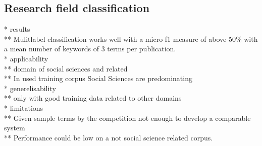 \subsection{Research field classification}
* results\\
**    Mulitlabel classification works well with a  micro f1 measure of above 50\% with a mean number of keywords of 3 terms per publication.\\
* applicability\\
**    domain of social sciences and related\\
**    In used training corpus Social Sciences are predominating\\
* generelisability\\
**    only with good training data related to other domains\\
* limitations\\
**    Given sample terms by the competition not enough to develop a comparable system\\
**    Performance could be low on a not social science related corpus.\\


